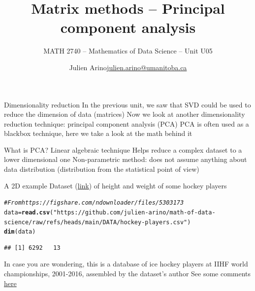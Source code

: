 \documentclass[aspectratio=169]{beamer}\usepackage[]{graphicx}\usepackage[]{xcolor}
\subtitle{MATH 2740 -- Mathematics of Data Science -- Unit U05}
\author{\texorpdfstring{Julien Arino\newline\url{julien.arino@umanitoba.ca}}{Julien Arino}}
\institute{Department of Mathematics @ University of Manitoba}
\title{Matrix methods -- Principal component analysis}
\makeatletter
\newcommand{\hlsng}[1]{\textcolor[rgb]{0.192,0.494,0.8}{#1}}%
\newcommand{\hlcom}[1]{\textcolor[rgb]{0.678,0.584,0.686}{\textit{#1}}}%
\newcommand{\hldef}[1]{\textcolor[rgb]{0.345,0.345,0.345}{#1}}%
\newcommand{\hlkwb}[1]{\textcolor[rgb]{0.69,0.353,0.396}{#1}}%
\newcommand{\hlkwd}[1]{\textcolor[rgb]{0.737,0.353,0.396}{\textbf{#1}}}%
\newenvironment{kframe}{%
 \def\at@end@of@kframe{}%
 \ifinner\ifhmode%
  \def\at@end@of@kframe{\end{minipage}}%
  \begin{minipage}{\columnwidth}%
 \fi\fi%
 \def\FrameCommand##1{\hskip\@totalleftmargin \hskip-\fboxsep
 \colorbox{shadecolor}{##1}\hskip-\fboxsep
     \hskip-\linewidth \hskip-\@totalleftmargin \hskip\columnwidth}%
 \MakeFramed {\advance\hsize-\width
   \@totalleftmargin\z@ \linewidth\hsize
   \@setminipage}}%
 {\par\unskip\endMakeFramed%
 \at@end@of@kframe}
\newenvironment{knitrout}{}{} %
\makeatother
\begin{document}
\setcounter{theorem}{79}

\SStitlepage
\SSoutlinepage



\begin{frame}{Dimensionality reduction}
In the previous unit, we saw that SVD could be used to reduce the dimension of data (matrices)
\vfill
Now we look at another dimensionality reduction technique: principal component analysis (PCA)
\vfill
PCA is often used as a blackbox technique, here we take a look at the math behind it
\end{frame}


\begin{frame}{What is PCA?}
Linear algebraic technique 
\vfill
Helps reduce a complex dataset to a lower dimensional one
\vfill
Non-parametric method: does not assume anything about data distribution (distribution from the statistical point of view)
\end{frame}


\begin{frame}[fragile]{A 2D example}
Dataset (\href{https://opendata.stackexchange.com/questions/7793/age-weight-and-height-dataset}{link}) of height and weight of some hockey players
\vfill
\begin{knitrout}
\color{fgcolor}\begin{kframe}
\begin{alltt}
\hlcom{# From https://figshare.com/ndownloader/files/5303173}
\hldef{data} \hlkwb{=} \hlkwd{read.csv}\hldef{(}\hlsng{"https://github.com/julien-arino/math-of-data-science/raw/refs/heads/main/DATA/hockey-players.csv"}\hldef{)}
\hlkwd{dim}\hldef{(data)}
\end{alltt}
\begin{verbatim}
## [1] 6292   13
\end{verbatim}
\end{kframe}
\end{knitrout}
\vfill
In case you are wondering, this is a database of ice hockey players at IIHF world championships, 2001-2016, assembled by the dataset's author
\vfill
See some comments \href{https://ikashnitsky.github.io/2017/ice-hockey-players-height/}{here}
\vfill

\end{frame}
\end{document}
